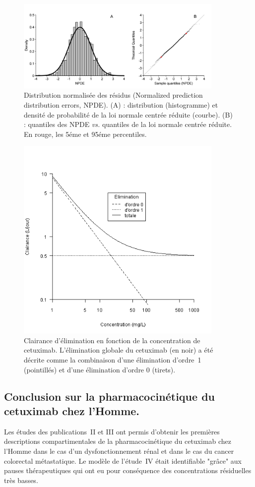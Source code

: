 \begin{figure}[htbp]
	\centering
		\includegraphics[width=10cm]{figures/raster/FIG_21}
	\caption[Distribution normalisée des résidus (\gls{NPDE})]{Distribution normalisée des résidus (Normalized prediction distribution errors, \gls{NPDE}). (A) : distribution (histogramme) et densité de probabilité de la loi normale centrée réduite (courbe). (B) : quantiles des NPDE \textit{vs.} quantiles de la loi normale centrée réduite. En rouge, les 5éme et 95éme percentiles.}
	\label{fig:21}
\end{figure}
\begin{figure}[htbp]
	\centering
		\includegraphics[width=10cm]{figures/raster/FIG_22}
	\caption[Clairance d'élimination en fonction de la concentration de cetuximab.]{Clairance d'élimination en fonction de la concentration de cetuximab. L'élimination globale du cetuximab (en noir) a été décrite comme la combinaison d'une élimination d'ordre~1 (pointillés) et d'une élimination d'ordre 0 (tirets).}
	\label{fig:22}
\end{figure}

\subsection{Conclusion sur la pharmacocinétique du cetuximab chez l'Homme.}
Les études des publications~II et III ont permis d'obtenir les premières descriptions compartimentales de la pharmacocinétique du cetuximab chez l'Homme dans le cas d'un dysfonctionnement rénal et dans le cas du cancer colorectal métastatique. Le modèle de l'étude~IV était identifiable "grâce" aux pauses thérapeutiques qui ont eu pour conséquence des concentrations résiduelles très basses.

